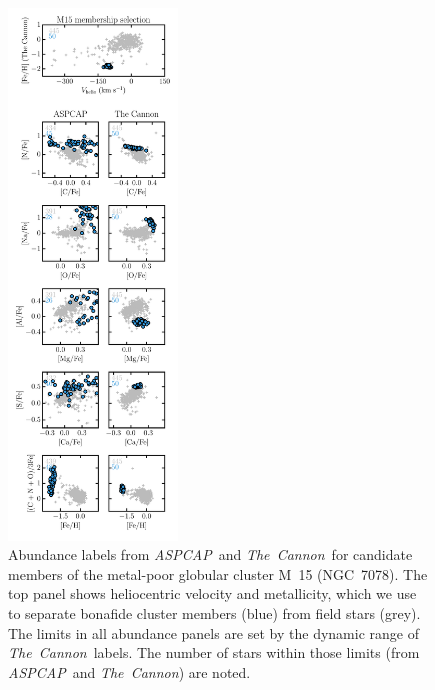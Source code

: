 \documentclass[12pt,preprint]{aastex}
\newcommand{\project}[1]{\textsl{#1}}
\newcommand{\TheCannon}{\project{The~Cannon}}
\newcommand{\acronym}[1]{{\small{#1}}}
\newcommand{\aspcap}{\project{\acronym{ASPCAP}}}
\begin{document}


\clearpage



\begin{figure}[p]
\includegraphics[width=0.40\textwidth]{M15_comparison.pdf}
\caption{Abundance labels from \aspcap\ and \TheCannon\ for candidate
members of the metal-poor globular cluster M~15 (NGC~7078).  The top panel
shows heliocentric velocity and metallicity, which we use to separate
bonafide cluster members (blue) from field stars (grey). The limits
in all abundance panels are set by the dynamic range of \TheCannon\ labels.
The number of stars within those limits (from \aspcap\ and \TheCannon)
are noted.\label{fig:m15-comparison}}
\end{figure}
\end{document}
